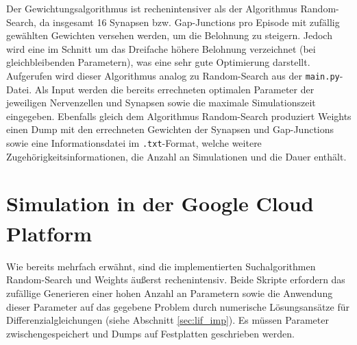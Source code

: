		Der Gewichtungsalgorithmus ist rechenintensiver als der Algorithmus Random-Search, da insgesamt 16 Synapsen bzw. Gap-Junctions pro Episode mit zufällig gewählten Gewichten versehen werden, um die Belohnung zu steigern. Jedoch wird eine im Schnitt um das Dreifache höhere Belohnung verzeichnet (bei gleichbleibenden Parametern), was eine sehr gute Optimierung darstellt. Aufgerufen wird dieser Algorithmus analog zu Random-Search aus der \texttt{main.py}-Datei. Als Input werden die bereits errechneten optimalen Parameter der jeweiligen Nervenzellen und Synapsen sowie die maximale Simulationszeit eingegeben. Ebenfalls gleich dem Algorithmus Random-Search produziert Weights einen Dump mit den errechneten Gewichten der Synapsen und Gap-Junctions sowie eine Informationsdatei im \texttt{.txt}-Format, welche weitere Zugehörigkeitsinformationen, die Anzahl an Simulationen und die Dauer enthält.
		
	\section{Simulation in der Google Cloud Platform\textsuperscript{\textregistered}}
	Wie bereits mehrfach erwähnt, sind die implementierten Suchalgorithmen Random-Search und Weights äußerst rechenintensiv. Beide Skripte erfordern das zufällige Generieren einer hohen Anzahl an Parametern sowie die Anwendung dieser Parameter auf das gegebene Problem durch numerische Lösungsansätze für Differenzialgleichungen (siehe Abschnitt \ref{sec:lif_imp}). Es müssen Parameter zwischengespeichert und Dumps auf Festplatten geschrieben werden.
	
